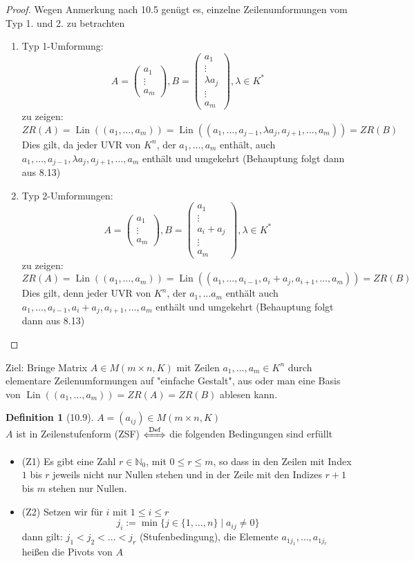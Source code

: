 \documentclass[a4paper]{scrartcl}
\DeclareMathOperator{\Lin}{Lin}
\theoremstyle{definition}
\newtheorem{defn}{Definition}
\theoremstyle{plain}
\theoremstyle{plain}
\theoremstyle{remark}
\theoremstyle{remark}
\theoremstyle{remark}
\theoremstyle{remark}
\theoremstyle{remark}
\begin{document}
\begin{proof}
Wegen Anmerkung nach 10.5 genügt es, einzelne Zeilenumformungen vom Typ 1. und 2. zu betrachten
\begin{enumerate}
\item Typ 1-Umformung:
\[A = \begin{pmatrix} a_1 \\ \vdots \\ a_m \end{pmatrix}, B = \begin{pmatrix} a_1 \\ \vdots \\ \lambda a_j \\ \vdots \\ a_m\end{pmatrix}, \lambda \in K^\ast\]
zu zeigen: \[ZR(A) = \Lin((a_1, \ldots, a_m)) = \Lin((a_1, \ldots, a_{j - 1}, \lambda a_j, a_{j + 1},\ldots, a_m)) = ZR(B)\]
Dies gilt, da jeder UVR von $K^n$, der $a_1, \ldots, a_m$ enthält, auch $a_1, \ldots, a_{j -1}, \lambda a_j, a_{j + 1}, \ldots, a_m$ enthält und umgekehrt (Behauptung folgt dann aus 8.13)
\item Typ 2-Umformungen:
\[A = \begin{pmatrix} a_1 \\ \vdots \\ a_m \end{pmatrix}, B = \begin{pmatrix} a_1 \\ \vdots \\ a_i + a_j \\ \vdots \\ a_m\end{pmatrix}, \lambda \in K^\ast\]
zu zeigen:
\[ZR(A) = \Lin((a_1, \ldots, a_m)) = \Lin((a_1, \ldots, a_{i - 1}, a_i + a_j, a_{i + 1}, \ldots, a_m)) = ZR(B)\]
Dies gilt, denn jeder UVR von $K^n$, der $a_1, \ldots a_m$ enthält auch $a_1, \ldots, a_{i - 1}, a_i + a_j, a_{i + 1}, \ldots, a_m$ enthält und umgekehrt (Behauptung folgt dann aus 8.13)
\end{enumerate}
\end{proof}
Ziel: Bringe Matrix $A \in M(m\times n, K)$ mit Zeilen $a_1, \ldots, a_m \in K^n$ durch elementare Zeilenumformungen auf "einfache Gestalt", aus oder man eine Basis von $\Lin((a_1, \dots, a_m)) = ZR(A) = ZR(B)$
ablesen kann.
\begin{defn}[10.9]
$A = (a_{ij}) \in M(m\times n, K)$ \\
  $A$ ist in Zeilenstufenform (ZSF) $\xLeftrightarrow{\text{Def}}$ die folgenden Bedingungen sind erfüllt
\begin{itemize}
\item (Z1) Es gibt eine Zahl $r\in\mathbb{N}_0$, mit $0\leq r \leq m$, so dass in den Zeilen mit Index $1$ bis $r$ jeweils nicht nur Nullen stehen und in der Zeile mit den Indizes $r + 1$ bis $m$ stehen nur Nullen.
\item (Z2) Setzen wir für $i$ mit $1 \leq i \leq r$
        \[j_{i} := \min\{j\in \{1, \ldots, n\} \mid a_{ij} \neq 0\}\]
        dann gilt: $j_1 < j_2 < \ldots < j_r$ (Stufenbedingung), die Elemente $a_{1j_1}, \ldots, a_{1j_r}$ heißen die Pivots von $A$
\end{itemize}
\end{defn}
\end{document}
